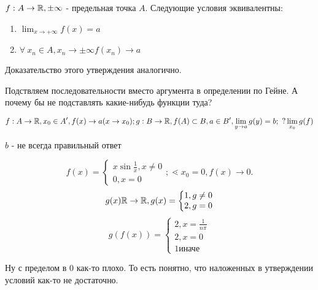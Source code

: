\documentclass[12pt]{report}
\begin{document}
\begin{thm}
$f: A \to \mathbb{R}, \pm \infty$ - предельная точка $A$. Следующие условия эквивалентны:
\begin{enumerate}
\item $\lim_{x \to +\infty}{f(x)} = a$
\item $\forall ~x_n \in A, x_n \to \pm\infty f(x_n) \to a$
\end{enumerate}

Доказательство этого утверждения аналогично.
\end{thm}

\begin{note}
Подствляем последовательности вместо аргумента в определении по Гейне. А почему бы не подставлять какие-нибудь функции туда?
\end{note}

\begin{st}
$$f: A \to \mathbb{R}, x_0 \in A', f(x) \to a (x \to x_0); g: B \to \mathbb{R}, f(A) \subset B, a \in B', \lim_{y \to a}{g(y)} = b; ~?\lim_{x_0}{g(f)}$$

$b$ - не всегда правильный ответ
\end{st}
\begin{ex}
$$f(x) = \left\{
\begin{matrix}
x\sin{\frac{1}{x}}, x \neq 0\\
0, x = 0
\end{matrix}\right.; \lessdot x_0 = 0, f(x) \to 0.
$$
$$g(x) \mathbb{R} \to \mathbb{R}, g(x) = 
\left\{
\begin{matrix}
1, g \neq 0\\
2, g = 0
\end{matrix}\right.
$$
$$g(f(x)) = \left\{
\begin{matrix}
2, x = \frac{1}{n\pi}\\
2, x = 0\\
1 \mbox{иначе}
\end{matrix}\right.
$$

Ну с пределом в $0$ как-то плохо. То есть понятно, что наложенных в утверждении условий как-то не достаточно.
\end{ex}
\end{document}
